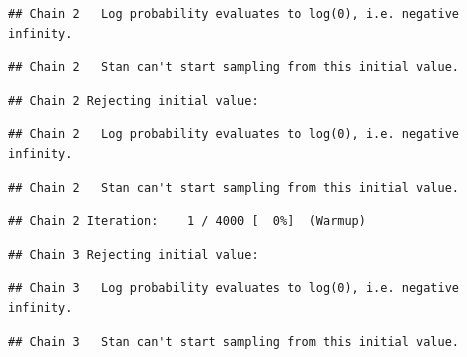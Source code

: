 \documentclass[
]{article}
\begin{document}
\begin{verbatim}
## Chain 2   Log probability evaluates to log(0), i.e. negative infinity.
\end{verbatim}

\begin{verbatim}
## Chain 2   Stan can't start sampling from this initial value.
\end{verbatim}

\begin{verbatim}
## Chain 2 Rejecting initial value:
\end{verbatim}

\begin{verbatim}
## Chain 2   Log probability evaluates to log(0), i.e. negative infinity.
\end{verbatim}

\begin{verbatim}
## Chain 2   Stan can't start sampling from this initial value.
\end{verbatim}

\begin{verbatim}
## Chain 2 Iteration:    1 / 4000 [  0%]  (Warmup)
\end{verbatim}

\begin{verbatim}
## Chain 3 Rejecting initial value:
\end{verbatim}

\begin{verbatim}
## Chain 3   Log probability evaluates to log(0), i.e. negative infinity.
\end{verbatim}

\begin{verbatim}
## Chain 3   Stan can't start sampling from this initial value.
\end{verbatim}
\end{document}
